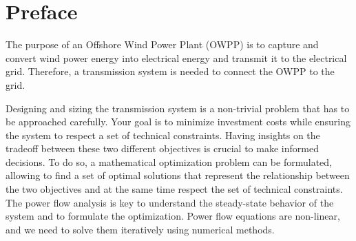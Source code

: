 \documentclass[a4paper,11pt, titlepage, twoside]{article}
\begin{document}





\printnomenclature


\listoffigures

\listoftables




\section{Preface}

The purpose of an Offshore Wind Power Plant (OWPP) is to capture and convert wind power energy into electrical energy and transmit it to the electrical grid.
Therefore, a transmission system is needed to connect the OWPP to the grid. 

Designing and sizing the transmission system is a non-trivial problem that has to be approached carefully. Your goal is to minimize investment costs while ensuring the system to respect a set of technical constraints. Having insights on the tradeoff between these two different objectives
is crucial to make informed decisions. To do so, a mathematical optimization problem can be formulated, allowing to find a set of optimal solutions that represent the relationship between the two objectives and at the same time respect the set of technical constraints.
The power flow analysis is key to understand the steady-state behavior of the system and to formulate the optimization. Power flow equations are non-linear, and we need to solve them iteratively using numerical methods. 
\end{document}
